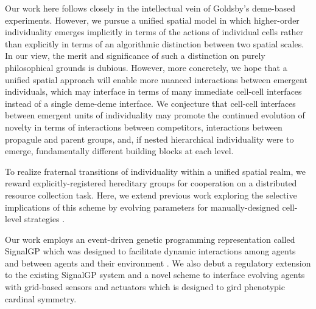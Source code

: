 Our work here follows closely in the intellectual vein of Goldsby's deme-based experiments.
However, we pursue a unified spatial model in which higher-order individuality emerges implicitly in terms of the actions of individual cells rather than explicitly in terms of an algorithmic distinction between two spatial scales.
In our view, the merit and significance of such a distinction on purely philosophical grounds is dubious.
However, more concretely, we hope that a unified spatial approach will enable more nuanced interactions between emergent individuals, which may interface in terms of many immediate cell-cell interfaces instead of a single deme-deme interface.
We conjecture that cell-cell interfaces between emergent units of individuality may promote the continued evolution of novelty in terms of interactions between competitors, interactions between propagule and parent groups, and, if nested hierarchical individuality were to emerge, fundamentally different building blocks at each level.

To realize fraternal transitions of individuality within a unified spatial realm, we reward explicitly-registered hereditary groups for cooperation on a distributed resource collection task.
Here, we extend previous work exploring the selective implications of this scheme by evolving parameters for manually-designed cell-level strategies \citep{moreno2019toward}.

Our work employs an event-driven genetic programming representation called SignalGP which was designed to facilitate dynamic interactions among agents and between agents and their environment \citep{lalejini2018evolving}.
We also debut a regulatory extension to the existing SignalGP system and a novel scheme to interface evolving agents with grid-based sensors and actuators which is designed to gird phenotypic cardinal symmetry.
